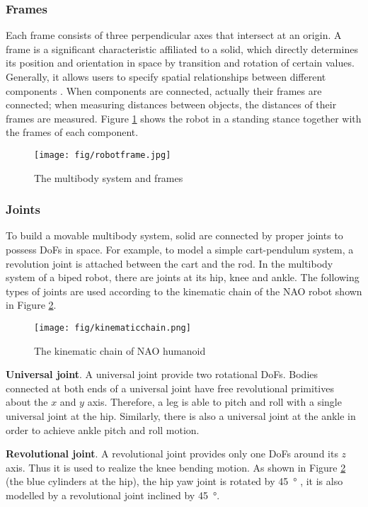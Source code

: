 \subsubsection{Frames}

Each frame consists of three perpendicular axes that intersect at an origin. A frame is a significant characteristic affiliated to a solid, which directly determines its position and orientation in space by transition and rotation of certain values. Generally, it allows users to specify spatial relationships between different components \cite{frames}. When components are connected, actually their frames are connected; when measuring distances between objects, the distances of their frames are measured. Figure {\ref{robotframe}} shows the robot in a standing stance together with the frames of each component. 
\begin{figure}[H]
	\centering
	\texttt{[image: fig/robotframe.jpg]}
	\caption{The multibody system and frames}
	\label{robotframe}
\end{figure}

\subsubsection{Joints}
To build a movable multibody system, solid are connected by proper joints to possess DoFs in space. For example, to model a simple cart-pendulum system, a revolution joint is attached between the cart and the rod. In the multibody system of a biped robot, there are joints at its hip, knee and ankle. The following types of joints are used according to the kinematic chain of the NAO robot shown in Figure {\ref{kinematicchain}}.
\begin{figure}[H]
	\centering
	\texttt{[image: fig/kinematicchain.png]}
	\caption[The kinematic chain of NAO humanoid]{The kinematic chain of NAO humanoid \cite{gouaillier2009mechatronic}}
	\label{kinematicchain}
\end{figure}

\textbf{Universal joint}.
A universal joint provide two rotational DoFs. Bodies connected at both ends of a universal joint have free revolutional primitives about the $ x $ and $ y $ axis. Therefore, a leg is able to pitch and roll with a single universal joint at the hip. Similarly, there is also a universal joint at the ankle in order to achieve ankle pitch and roll motion.  

\textbf{Revolutional joint}.
A revolutional joint provides only one DoFs around its $ z $ axis. Thus it is used to realize the knee bending motion. As shown in Figure {\ref{kinematicchain}} (the blue cylinders at the hip), the hip yaw joint is rotated by \SI{45}{\degree} \cite{graf2009robust}, it is also modelled by a revolutional joint inclined by \SI{45}{\degree}.  

